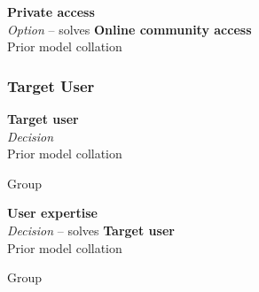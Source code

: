 
\textbf{Private access} \\ \emph{Option} -- solves \textbf{Online community access} \\ Prior model collation \cite{Aghaee2012}


\subsubsection{Target User}


\textbf{Target user} \\ \emph{Decision} \\ Prior model collation

Group

\textbf{User expertise} \\ \emph{Decision} -- solves \textbf{Target user} \\ Prior model collation

Group

